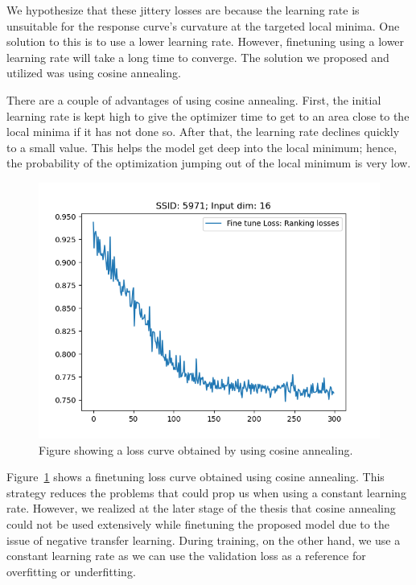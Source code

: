 \documentclass[12pt, twoside, ngerman]{report}
\begin{document}
We hypothesize that these jittery losses are because the learning rate is unsuitable for the response curve's curvature at the targeted local minima.
One solution to this is to use a lower learning rate.
However,  finetuning using a lower learning rate will take a long time to converge.
The solution we proposed and utilized was using cosine annealing.

There are a couple of advantages of using cosine annealing.
First, the initial learning rate is kept high to give the optimizer time to get to an area close to the local minima if it has not done so.
After that, the learning rate declines quickly to a small value.
This helps the model get deep into the local minimum; hence, the probability of the optimization jumping out of the local minimum is very low.

\begin{figure}[htb]
  \centering
    \includegraphics[scale=0.45]{images/goodFTLoss}
    \caption{Figure showing a loss curve obtained by using cosine annealing.}
    \label{fig:goodFTLoss}
\end{figure}

Figure~\ref{fig:goodFTLoss} shows a finetuning loss curve obtained using cosine annealing.
This strategy reduces the problems that could prop us when using a constant learning rate. However, we realized at the later stage of the thesis that cosine annealing could not be used extensively while finetuning the proposed model due to the issue of negative transfer learning.
During training, on the other hand, we use a constant learning rate as we can use the validation loss as a reference for overfitting or underfitting.
\end{document}
